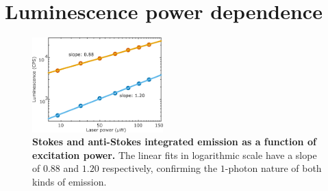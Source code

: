 \documentclass[journal=nalefd,manuscript=letter]{achemso}
\begin{document}
%
%
%


\pagebreak
\section{Luminescence power dependence}

\begin{figure}[htp] \centering
\includegraphics[width=0.45\textwidth]{Figures/Supplementary/03_AS_S_in_Log/03_AS_S_in_Log.png}
\caption{\textbf{Stokes and anti-Stokes integrated emission as a function of excitation power.} The
linear fits in logarithmic scale have a slope of $0.88$ and $1.20$ respectively,
confirming the $1$-photon nature of both kinds of emission.}
	\label{fig:Log_Plot}
\end{figure}
\end{document}
